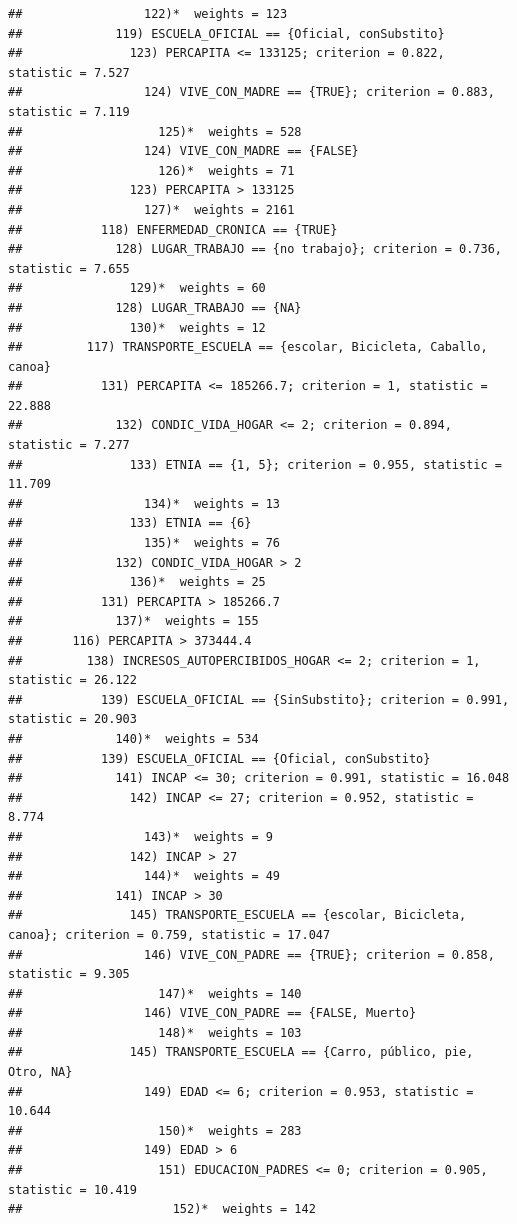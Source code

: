 \documentclass[
]{article}
\begin{document}
\begin{verbatim}
##                 122)*  weights = 123 
##             119) ESCUELA_OFICIAL == {Oficial, conSubstito}
##               123) PERCAPITA <= 133125; criterion = 0.822, statistic = 7.527
##                 124) VIVE_CON_MADRE == {TRUE}; criterion = 0.883, statistic = 7.119
##                   125)*  weights = 528 
##                 124) VIVE_CON_MADRE == {FALSE}
##                   126)*  weights = 71 
##               123) PERCAPITA > 133125
##                 127)*  weights = 2161 
##           118) ENFERMEDAD_CRONICA == {TRUE}
##             128) LUGAR_TRABAJO == {no trabajo}; criterion = 0.736, statistic = 7.655
##               129)*  weights = 60 
##             128) LUGAR_TRABAJO == {NA}
##               130)*  weights = 12 
##         117) TRANSPORTE_ESCUELA == {escolar, Bicicleta, Caballo, canoa}
##           131) PERCAPITA <= 185266.7; criterion = 1, statistic = 22.888
##             132) CONDIC_VIDA_HOGAR <= 2; criterion = 0.894, statistic = 7.277
##               133) ETNIA == {1, 5}; criterion = 0.955, statistic = 11.709
##                 134)*  weights = 13 
##               133) ETNIA == {6}
##                 135)*  weights = 76 
##             132) CONDIC_VIDA_HOGAR > 2
##               136)*  weights = 25 
##           131) PERCAPITA > 185266.7
##             137)*  weights = 155 
##       116) PERCAPITA > 373444.4
##         138) INCRESOS_AUTOPERCIBIDOS_HOGAR <= 2; criterion = 1, statistic = 26.122
##           139) ESCUELA_OFICIAL == {SinSubstito}; criterion = 0.991, statistic = 20.903
##             140)*  weights = 534 
##           139) ESCUELA_OFICIAL == {Oficial, conSubstito}
##             141) INCAP <= 30; criterion = 0.991, statistic = 16.048
##               142) INCAP <= 27; criterion = 0.952, statistic = 8.774
##                 143)*  weights = 9 
##               142) INCAP > 27
##                 144)*  weights = 49 
##             141) INCAP > 30
##               145) TRANSPORTE_ESCUELA == {escolar, Bicicleta, canoa}; criterion = 0.759, statistic = 17.047
##                 146) VIVE_CON_PADRE == {TRUE}; criterion = 0.858, statistic = 9.305
##                   147)*  weights = 140 
##                 146) VIVE_CON_PADRE == {FALSE, Muerto}
##                   148)*  weights = 103 
##               145) TRANSPORTE_ESCUELA == {Carro, público, pie, Otro, NA}
##                 149) EDAD <= 6; criterion = 0.953, statistic = 10.644
##                   150)*  weights = 283 
##                 149) EDAD > 6
##                   151) EDUCACION_PADRES <= 0; criterion = 0.905, statistic = 10.419
##                     152)*  weights = 142 

\end{verbatim}
\end{document}
